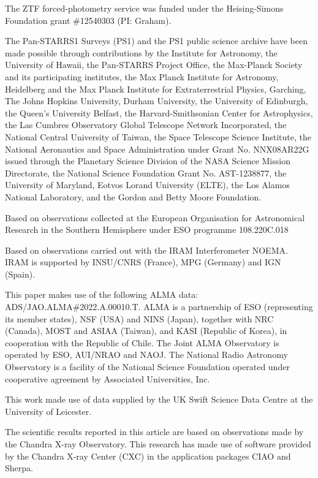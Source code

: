 \documentclass{nature_plusfigure}
\begin{document}
\begin{addendum}
The ZTF forced-photometry service was funded under the Heising-Simons Foundation grant \#12540303 (PI: Graham).

The Pan-STARRS1 Surveys (PS1) and the PS1 public science archive have been made possible through contributions by the Institute for Astronomy, the University of Hawaii, the Pan-STARRS Project Office, the Max-Planck Society and its participating institutes, the Max Planck Institute for Astronomy, Heidelberg and the Max Planck Institute for Extraterrestrial Physics, Garching, The Johns Hopkins University, Durham University, the University of Edinburgh, the Queen's University Belfast, the Harvard-Smithsonian Center for Astrophysics, the Las Cumbres Observatory Global Telescope Network Incorporated, the National Central University of Taiwan, the Space Telescope Science Institute, the National Aeronautics and Space Administration under Grant No. NNX08AR22G issued through the Planetary Science Division of the NASA Science Mission Directorate, the National Science Foundation Grant No. AST-1238877, the University of Maryland, Eotvos Lorand University (ELTE), the Los Alamos National Laboratory, and the Gordon and Betty Moore Foundation.

Based on observations collected at the European Organisation for Astronomical Research in the Southern Hemisphere under ESO programme 108.220C.018

Based on observations carried out with the IRAM Interferometer NOEMA. IRAM is supported by INSU/CNRS (France), MPG (Germany) and IGN (Spain).

This paper makes use of the following ALMA data: ADS/JAO.ALMA\#2022.A.00010.T. ALMA is a partnership of ESO (representing its member states), NSF (USA) and NINS (Japan), together with NRC (Canada), MOST and ASIAA (Taiwan), and KASI (Republic of Korea), in cooperation with the Republic of Chile. The Joint ALMA Observatory is operated by ESO, AUI/NRAO and NAOJ. The National Radio Astronomy Observatory is a facility of the National Science Foundation operated under cooperative agreement by Associated Universities, Inc.

This work made use of data supplied by the UK Swift Science Data Centre at the University of Leicester.

The scientific results reported in this article are based on observations made by the Chandra X-ray Observatory. This research has made use of software provided by the Chandra
X-ray Center (CXC) in the application packages CIAO and Sherpa.


\end{addendum}
\end{document}
